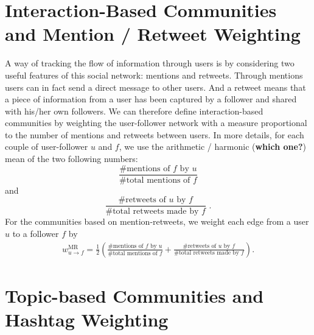 \section{Interaction-Based Communities and Mention / Retweet Weighting}

\label{method-interaction}

A way of tracking the flow of information through users is by considering two useful features of this social network: mentions and retweets. Through mentions users can in fact send a direct message to other users. And a retweet means that a piece of information from a user has been captured by a follower and shared with his/her own followers. We can therefore define interaction-based communities by weighting the user-follower network with a measure proportional to the number of mentions and retweets between users. In more details, for each couple of user-follower $u$ and $f$, we use the arithmetic / harmonic (\textbf{which one?}) mean of the two following numbers:
\begin{equation}
\frac{\mbox{\# mentions of }f \mbox{ by }u}{\mbox{\# total mentions of }f}
\end{equation}
and
\begin{equation}
\frac{\mbox{\# retweets of }u \mbox{ by }f}{\mbox{\# total retweets made by }f} \mbox{ .}
\end{equation}
For the communities based on mention-retweets, we weight each edge from a user $u$ to a follower $f$ by 
\begin{align}
	w_{u \to f}^{\text{MR}} = \frac{1}{2}\left(\frac{\mbox{\# mentions of }f \mbox{ by }u}{\mbox{\# total mentions of }f} + \frac{\mbox{\# retweets of }u \mbox{ by }f}{\mbox{\# total retweets made by }f}\right).
\end{align} 

\section{Topic-based Communities and Hashtag Weighting}

\label{method-topic}

